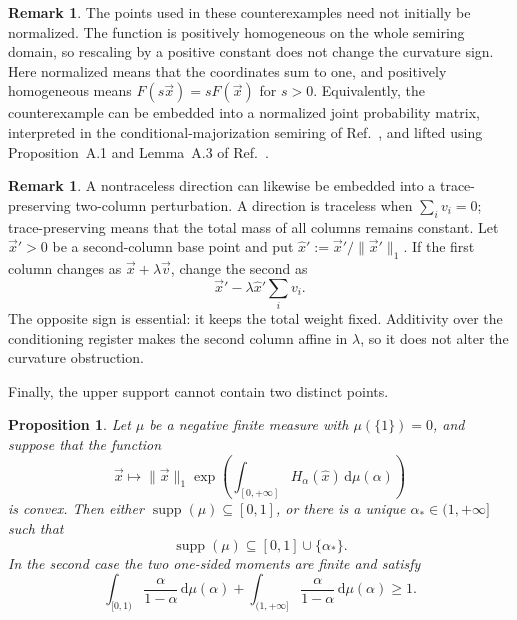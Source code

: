 \documentclass[aps,pra,11pt,onecolumn,nofootinbib,tightenlines]{revtex4-2}
\newtheorem{proposition}[theorem]{Proposition}
\theoremstyle{definition}
\newtheorem{remark}[theorem]{Remark}
\def\d{\mathrm{d}}
\newcommand{\ParameterMainLift}{Proposition~A.1 and Lemma~A.3 of Ref.~\cite{rubboli2026complete}}
\newcommand{\ParameterMainSemiring}{the conditional-majorization semiring of Ref.~\cite{rubboli2026complete}}
\begin{document}
\begin{remark}
\label{rem:normalizing-witnesses}
The points used in these counterexamples need not initially be normalized.  The
function is positively homogeneous on the whole semiring domain, so rescaling by
a positive constant does not change the curvature sign.  Here normalized means
that the coordinates sum to one, and positively homogeneous means
$F(s\vec{x})=sF(\vec{x})$ for $s>0$.  Equivalently, the
counterexample can be embedded into a normalized joint probability matrix,
interpreted in \ParameterMainSemiring, and lifted using \ParameterMainLift.
\end{remark}

\begin{remark}
\label{rem:trace-preserving-witnesses}
A nontraceless direction can likewise be embedded into a trace-preserving
two-column perturbation.  A direction is traceless when $\sum_i v_i=0$;
trace-preserving means that the total mass of all columns remains constant.
Let $\vec{x}'>0$ be a second-column base point and put
$\hat{x}':=\vec{x}'/\|\vec{x}'\|_1$.  If the first column changes as
$\vec{x}+\lambda\vec{v}$, change the second as
\begin{equation}
\vec{x}'-\lambda\hat{x}'\sum_i v_i.
\end{equation}
The opposite sign is essential: it keeps the total weight fixed.  Additivity over
the conditioning register makes the second column affine in $\lambda$, so it
does not alter the curvature obstruction.
\end{remark}

Finally, the upper support cannot contain two distinct points.

\begin{proposition}
\label{prop:third-measure}
Let $\mu$ be a negative finite measure with $\mu(\{1\})=0$, and suppose that the
function
\begin{equation}
\vec{x}\longmapsto\|\vec{x}\|_1
\exp\!\left(\int_{[0,+\infty]}H_\alpha(\hat{x})\,
\d\mu(\alpha)\right)
\end{equation}
is convex.  Then either $\operatorname{supp}(\mu)\subseteq[0,1]$, or there is a
unique $\alpha_*\in(1,+\infty]$ such that
\begin{equation}
\operatorname{supp}(\mu)\subseteq[0,1]\cup\{\alpha_*\}.
\end{equation}
In the second case the two one-sided moments are finite and satisfy
\begin{equation}
\label{eq:negative-moment-necessary}
\int_{[0,1)}\frac{\alpha}{1-\alpha}\,\d\mu(\alpha)
+\int_{(1,+\infty]}\frac{\alpha}{1-\alpha}\,\d\mu(\alpha)\geq1.
\end{equation}
\end{proposition}
\end{document}
